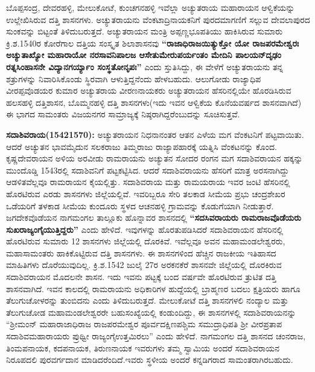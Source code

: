 ಬೊಪ್ಪಸಂದ್ರ, ದೇವರಹಳ್ಳಿ, ಮೇಲುಕೋಟೆ, ಕುಂಚಗನಹಳ್ಳಿ ಇವೆಲ್ಲಾ ಅಚ್ಯುತರಾಯ ಮಹಾರಾಯನ ಆಳ್ವಿಕೆಯನ್ನು ಉಲ್ಲೇಖಿಸಿರುವ ದತ್ತಿ ಶಾಸನಗಳು. ಅಚ್ಯುತರಾಯನು ವೆಂಕಟಾದ್ರಿನಾಯಕನಿಗೆ ಪುರದಮಾಗಣಿಗೆ ಸಲ್ಲುವ ದೇವಲಾಪುರದ ಸುಂಕವನ್ನು ಬಿಟ್ಟಂತೆ ತಿಳಿದುಬರುತ್ತದೆ. ಅಚ್ಯುತರಾಯನ ಮಂತ್ರಿ ಅಪ್ಪಣ್ಣಭೂಪತಿಯು ಹಾಕಿಸಿರುವ ಸುಮಾರು ಕ್ರಿ.ಶ.1540ರ ಕೋರೆಗಾಲ ದತ್ತಿಯ ಸಂಸ್ಕೃತ ಶಿಲಾಶಾಸನವು \textbf{“ರಾಜಾಧಿರಾಜಯಿತ್ಯುಕ್ತೋ ಯೋ ರಾಜಪರಮೇಶ್ವರಃ ಅಚ್ಯುತಾಖ್ಯೋ ಮಹಾರಾಯೋ ನರಸಾವನಿಪಾಲಜ ಆಸೇತುಮೇರುಪರ್ಯಂತಂ ಮೇದಿನಿ ಪಾಲಯನ್​ ದೃಢಂ ರತ್ನಸಿಂಹಾಸನೇ ವಿದ್ಯಾನಗರ್ಯ್ಯಾಂ ಸಂಸ್ಥತೋನೃಪಃ” }ಎಂದು ಸ್ತುತಿಸಿದ್ದು, ಈ ವೇಳೆಗೆ ಅಚ್ಯುತರಾಯನು ತನ್ನ ಶತ್ರುಗಳನ್ನು ನಿವಾರಿಸಿಕೊಂಡು ಸ್ಥಿರವಾಗಿ ಆಳುತ್ತಿದ್ದನೆಂದು ಹೇಳಬಹುದು. ಆಲುಗೋಡು ರಾಜ್ಯಾಧಿಪ ವೀರಪ್ಪವೊಡಯರ ಕುಮಾರ ಅಚ್ಯುತರಾಯ ವೀರಣನಾಯಕರು ಅಚ್ಯುತರಾಯನ ಹೆಸರಿನಲ್ಲಿಯೇ ಹೊರಡಿಸಿರುವ ಹಲಸಹಳ್ಳಿ ದತ್ತಿಶಾಸನ, ಬೊಮ್ಮನಹಳ್ಳಿ ದತ್ತಿ ಶಾಸನಗಳು(ಇದು ಇವನ ಆಳ್ವಿಕೆಯ ಕೊನೆಯವರ್ಷದ ಶಾಸನವಾಗಿದೆ) ಈ ಭಾಗದ ಸಾಮಂತರು ವಿಜಯನಗರ ಸಾಮ್ರಾಜ್ಯಕ್ಕೆ ನಿಷ್ಠರಾಗಿದ್ದರೆಂಬುದನ್ನು ಸೂಚಿಸುತ್ತವೆ. 

\textbf{ ಸದಾಶಿವರಾಯ(15421570):} ಅಚ್ಯುತರಾಯನ ನಿಧನಾನಂತರ ಆತನ ಎಳೆಯ ಮಗ ವೆಂಕಟನಿಗೆ ಪಟ್ಟವಾಯಿತು. ಆದರೆ ಅಚ್ಯುತನ ಭಾವಮೈದುನ ಸಲಕರಾಜು ತಿಮ್ಮರಾಜು ರಾಜ್ಯಾಪಹಾರಕ್ಕೆ ಯತ್ನಿಸಿ ವೆಂಕಟನನ್ನು ಕೊಂದ. ಕೃಷ್ಣದೇವರಾಯನ ಅಳಿಯ ಅರವೀಡು ರಾಮರಾಯನು ಅಚ್ಯುತನ ಸೋದರ ರಂಗನ ಮಗ ಸದಾಶಿವರಾಯನ ಹಕ್ಕನ್ನು ಮುಂದೊಡ್ಡಿ 1543ರಲ್ಲಿ ಸದಾಶಿವನಿಗೆ ಪಟ್ಟಕಟ್ಟಿಸಿದ. ಆದರೆ ಸದಾಶಿವರಾಯನು ಹೆಸರಿಗೆ ಮಾತ್ರ ಅರಸನಾಗಿದ್ದು ಆಡಳಿತವೆಲ್ಲವೂ ರಾಮರಾಯನ ಕೈಯಲ್ಲಿತ್ತು. ಸದಾಶಿವರಾಯ ಮತ್ತು ರಾಮಯರಾಯ ಇವರ ಜಂಟಿ ಹೆಸರಿನಲ್ಲಿ ಹೊರಟಿರುವ ಎರಡು ಶಾಸನಗಳು ಜಿಲ್ಲೆಯಲ್ಲಿವೆ. ಇವರಿಬ್ಬರೂ ಸೇರಿ ತಲಕಾಡ ಸೀಮೆಯ ಪ್ರಭು ಚಂದ್ರಶೇಖರ ಒಡೆಯರಿಗೆ ತಳಕಾಡ ಸೀಮೆಯ ಕುಂದೂರು ಸ್ಥಳದ ಆಚನಹಳ್ಳಿ ಗ್ರಾಮವನ್ನು ಕೊಡುಗೆಯಾಗಿ ನೀಡುತ್ತಾರೆ. ಜಗದೇಕವೊಡೆಯನ ನಾಗಮಂಗಲ ತಾಲ್ಲೂಕು ಹೊನ್ನಾವರ ಶಾಸನದಲ್ಲಿ \textbf{“ಸದಸಿವರಾಯರು ರಾಮರಾಜವೊಡೆಯರು ಸುಖರಾಜ್ಯಂಗೈಯುತ್ತಿದ್ದರು” }ಎಂದು ಹೇಳಿದೆ. ಇವುಗಳನ್ನು ಹೊರತುಪಡಿಸಿದರೆ ಸದಾಶಿವರಾಯನ ಹೆಸರಿನಲ್ಲಿ ಹೊರಟಿರುವ ಸುಮಾರು 12 ಶಾಸನಗಳು ಜಿಲ್ಲೆಯಲ್ಲಿ ದೊರಕಿವೆ. ಇವೆಲ್ಲವೂ ಅವನ ಮಹಾಮಂಡಲೇಶ್ವರರು, ಮಹಾಸಾಮಂತರು ಹಾಕಿಕೊಟ್ಟಿರುವ ದತ್ತಿ ಶಾಸನಗಳು. ಈ ಶಾಸನಗಳಿಂದ ಹೆಚ್ಚಿನ ರಾಜಕೀಯ ಇತಿಹಾಸದ ಮಾಹಿತಿಗಳು ದೊರೆಯುವುದಿಲ್ಲ. ಕ್ರಿ.ಶ.1542 ಜುಲೈ 27ರ ಅರಕನಕೆರೆ ಶಾಸನವೇ ಜಿಲ್ಲೆಯಲ್ಲಿ ದೊರಕಿರುವ ಸದಾಶಿವರಾಯನ ಮೊದಲನೇ ಶಾಸನ. ಇದು ಇವನು ಪಟ್ಟಕ್ಕೆ ಬಂದ ವರ್ಷವೇ ಹೊರಟಿರುವ ತ್ರುಟಿತ ದತ್ತಿ ಶಾಸನವಾಗಿದೆ. ಇವನ ಕಾಲದಲ್ಲಿ ರಾಮರಾಯನು ಅಧಿಕಾರಿಗಳ ಹುದ್ದೆಯಲ್ಲಿ ಬ್ರಾಹ್ಮಣರ ಬದಲು ಕ್ಷತ್ರಿಯರು ಹಾಗೂ ತೆಲುಗುಚೋಳರನ್ನು ತುಂಬಿದನು ಎಂದು ತಿಳಿದುಬರುತ್ತದೆ. ಮೇಲುಕೋಟೆ ದತ್ತಿ ಶಾಸನಗಳಲಿ ನಂದ್ಯಾಲ ಮತ್ತು ತೆಲುಗುಚೋಡ ಮಹಾಮಂಡಲೇಶ್ವರರೇ ಬಹುಸಂಖ್ಯೆಯಲ್ಲಿ ಕಂಡುಂದಿದ್ದು, ಈ ಶಾಸನಗಳಲ್ಲಿ ಸದಾಶಿವರಾಯನನ್ನು “ಶ‍್ರೀಮಂನ್​ ಮಹಾರಾಜಾಧಿರಾಜ ರಾಜಪರಮೇಶ್ವರ ಪೂರ್ವದಕ್ಷಿಣಪಶ್ಚಿಮ ಸಮುದ್ರಾಧಿಪತಿ ಶ‍್ರೀ ವೀರಪ್ರತಾಪ ಸದಾಶಿವಮಹಾರಾಯರು ಪ್ರುಥ್ವೀ ರಾಜ್ಯಂಗೈಉತ್ತಮಿರಲು” ಎಂದು ಹೇಳಿದೆ. ನಾಗಮಂಗಲ ದತ್ತಿ ಶಾಸನದ ಚಂನರಾಜ, ತಿಂಮಪನಾಯಕ, ಕದಪನಾಯಕ, ತಿರುಣನಾಯಕ ಇವರುಗಳು ತಮ್ಮ ಸ್ವಾಮಿಯ ಅಂದರೆ ಸದಾಶಿವರಾಯನ ನಿರೂಪದಲಿ ಪುರವರ್ಗದಾನ ಮಾಡಿದರೆಂದಿದೆ.ಇವರು ಸ್ಥಳೀಯ ಅಂದರೆ ಕನ್ನಡಿಗರಾದ ಸಾಮಂತರಾಗಿರಬಹುದು. 

